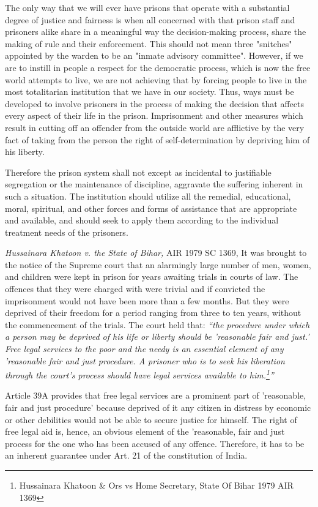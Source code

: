 \begin{multicols}{2}
\noi
The only way that we will ever have prisons that operate with a substantial degree of justice and fairness is when all concerned with that prison staff and prisoners alike share in a meaningful way the decision-making process, share the making of rule and their enforcement. This should not mean three "snitches" appointed by the warden to be an "inmate advisory committee". However, if we are to instill in people a respect for the democratic process, which is now the free world attempts to live, we are not achieving that by forcing people to live in the most totalitarian institution that we have in our society. Thus, ways must be developed to involve prisoners in the process of making the decision that affects every aspect of their life in the prison. Imprisonment and other measures which result in cutting off an offender from the outside world are afflictive by the very fact of taking from the person the right of self-determination by depriving him of his liberty.

\noi
Therefore the prison system shall not except as incidental to justifiable segregation or the maintenance of discipline, aggravate the suffering inherent in such a situation. The institution should utilize all the remedial, educational, moral, spiritual, and other forces and forms of assistance that are appropriate and available, and should seek to apply them according to the individual treatment needs of the prisoners.

\noi
\textit{Hussainara Khatoon v. the State of Bihar,} AIR 1979 SC 1369, It was brought to the notice of the Supreme court that an alarmingly large number of men, women, and children were kept in prison for years awaiting trials in courts of law. The offences that they were charged with were trivial and if convicted the imprisonment would not have been more than a few months. But they were deprived of their freedom for a period ranging from three to ten years, without the commencement of the trials. The court held that: \textit{“the procedure under which a person may be deprived of his life or liberty should be 'reasonable fair and just.' Free legal services to the poor and the needy is an essential element of any 'reasonable fair and just procedure. A prisoner who is to seek his liberation through the court's process should have legal services available to him.\footnote{Hussainara Khatoon \& Ors vs Home Secretary, State Of Bihar 1979 AIR 1369}”}

\noi
Article 39A provides that free legal services are a prominent part of 'reasonable, fair and just procedure’ because deprived of it any citizen in distress by economic or other debilities would not be able to secure justice for himself. The right of free legal aid is, hence, an obvious element of the 'reasonable, fair and just process for the one who has been accused of any offence. Therefore, it has to be an inherent guarantee under Art. 21 of the constitution of India.


\end{multicols}
